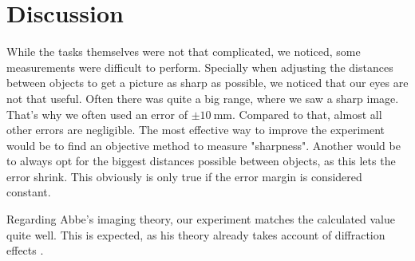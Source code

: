 \section{Discussion}
While the tasks themselves were not that complicated, we noticed, some measurements were difficult to perform.
Specially when adjusting the distances between objects to get a picture as sharp as possible, we noticed that our eyes are not that useful.
Often there was quite a big range, where we saw a sharp image.
That's why we often used an error of $\pm \SI{10}{\milli\meter}$.
Compared to that, almost all other errors are negligible.
The most effective way to improve the experiment would be to find an objective method to measure "sharpness".
Another would be to always opt for the biggest distances possible between objects, as this lets the error shrink.
This obviously is only true if the error margin is considered constant.

Regarding Abbe's imaging theory, our experiment matches the calculated value quite well. 
This is expected, as his theory already takes account of diffraction effects \cite{manual}.